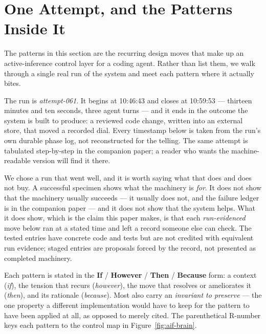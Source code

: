 \section{One Attempt, and the Patterns Inside It}\label{sec:catalog}

The patterns in this section are the recurring design moves that make up an
active-inference control layer for a coding agent.  Rather than list them, we
walk through a single real run of the system and meet each pattern where it
actually bites.

The run is \emph{attempt-061}.  It begins at 10:46:43 and closes
at 10:59:53 --- thirteen minutes and ten seconds, three agent turns --- and it
ends in the outcome the system is built to produce: a reviewed code change,
written into an external store, that moved a recorded dial.  Every timestamp
below is taken from the run's own durable phase log, not reconstructed for the
telling.  The same attempt is tabulated step-by-step in the companion paper; a
reader who wants the machine-readable version will find it there.

We chose a run that went well, and it is worth saying what that does and does
not buy.  A successful specimen shows what the machinery is \emph{for}.  It does
not show that the machinery usually succeeds --- it usually does not, and the
failure ledger is in the companion paper --- and it does not show that the
system helps.  What it does show, which is the claim this paper makes, is that
each \emph{run-evidenced} move below ran at a stated time and left a record
someone else can check.  The tested entries have concrete code and tests but
are not credited with equivalent run evidence; staged entries are proposals
forced by the record, not presented as completed machinery.

Each pattern is stated in the \textbf{If} / \textbf{However} / \textbf{Then} /
\textbf{Because} form: a context (\emph{if}), the tension that recurs
(\emph{however}), the move that resolves or ameliorates it (\emph{then}), and
its rationale (\emph{because}).  Most also carry an \emph{invariant to preserve}
--- the one property a different implementation would have to keep for the
pattern to have been applied at all, as opposed to merely cited.  The
parenthetical R-number keys each pattern to the control map in
Figure~\ref{fig:aif-brain}.

